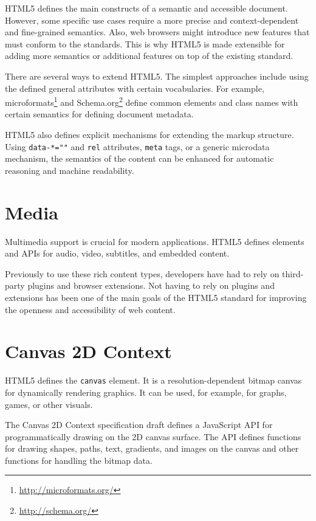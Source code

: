 HTML5 defines the main constructs of a semantic and accessible
document. However, some specific use cases require a more precise and
context-dependent and fine-grained semantics. Also, web browsers might
introduce new features that must conform to the standards. This is why
HTML5 is made extensible for adding more semantics or additional
features on top of the existing standard.

There are several ways to extend HTML5. The simplest approaches
include using the defined general attributes with certain
vocabularies. For example,
microformats\footnote{\url{http://microformats.org/}} and
Schema.org\footnote{\url{http://schema.org/}} define common elements
and class names with certain semantics for defining document metadata.

HTML5 also defines explicit mechanisms for extending the markup
structure. Using \texttt{data-*=""} and \texttt{rel} attributes,
\texttt{meta} tags, or a generic microdata mechanism, the semantics of
the content can be enhanced for automatic reasoning and machine
readability. \cite{HTML5draft}

\section{Media}

Multimedia support is crucial for modern applications. HTML5 defines
elements and APIs for audio, video, subtitles, and embedded content.

Previously to use these rich content types, developers have had to
rely on third-party plugins and browser extensions. Not having to rely
on plugins and extensions has been one of the main goals of the HTML5
standard for improving the openness and accessibility of web content.

\section{Canvas 2D Context}

HTML5 defines the \texttt{canvas} element. It is a
resolution-dependent bitmap canvas for dynamically rendering
graphics. It can be used, for example, for graphs, games, or other
visuals. \cite{HTML5draft}

The Canvas 2D Context specification draft \cite{canvas2Ddraft} defines
a JavaScript API for programmatically drawing on the 2D canvas
surface. The API defines functions for drawing shapes, paths, text,
gradients, and images on the canvas and other functions for handling
the bitmap data.

